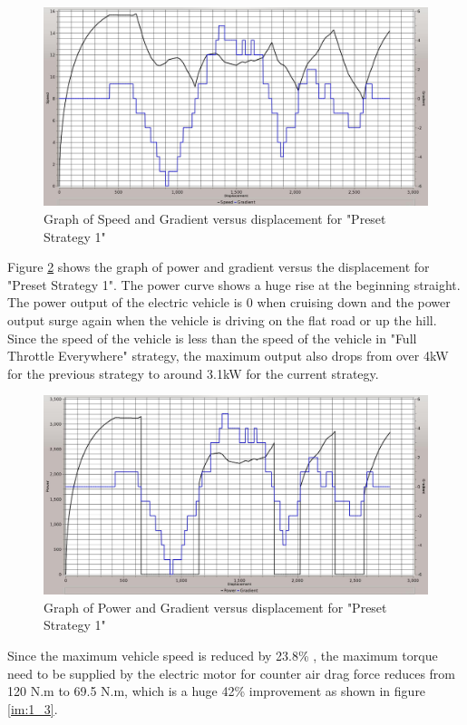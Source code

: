 \begin{figure}[htb]
	\centering
	\includegraphics[width=6in]{images/1_1.jpg}
	\caption{Graph of Speed and Gradient versus displacement for "Preset Strategy 1"}
	\label{im:1_1}
\end{figure}

Figure \ref{im:1_2} shows the graph of power and gradient versus the displacement for "Preset Strategy 1". The power curve shows a huge rise at the beginning straight. The power output of the electric vehicle is 0 when cruising down and the power output surge again when the vehicle is driving on the flat road or up the hill. Since the speed of the vehicle is less than the speed of the vehicle in "Full Throttle Everywhere" strategy, the maximum output also drops from over 4kW for the previous strategy to around 3.1kW for the current strategy.

\begin{figure}[htb]
	\centering
	\includegraphics[width=6in]{images/1_2.jpg}
	\caption{Graph of Power and Gradient versus displacement for "Preset Strategy 1"}
	\label{im:1_2}
\end{figure}

Since the maximum vehicle speed is reduced by 23.8\% , the maximum torque need to be supplied by the electric motor for counter air drag force reduces from 120 N.m to 69.5 N.m, which is a huge 42\% improvement as shown in figure \ref{im:1_3}.

